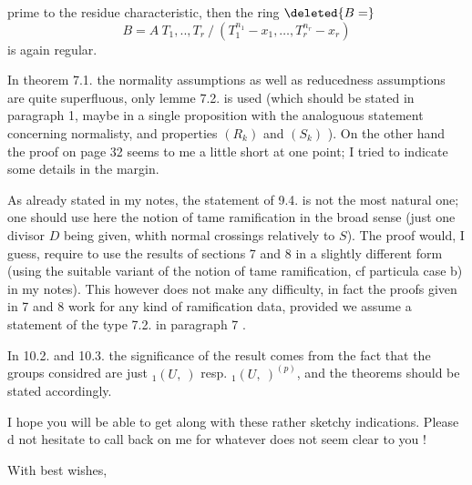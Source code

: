 prime to the residue characteristic, then the ring $\deleted{B=}$
\[
B=A\ T_1,..,T_r\ /\ (T_1^{n_1}-x_1,\ldots,T_r^{n_r}-x_r)
\]
is again regular.

In theorem 7.1. the normality assumptions as well as reducedness assumptions are quite superfluous, only lemme 7.2. is used (which should be stated in paragraph 1, maybe in a single proposition with the analoguous statement concerning normalisty, and properties $(R_k)$ and $(S_k)$ ). On the other hand the proof on page 32 seems to me  a little short at one point; I tried to indicate some details in the margin.

As already stated in my notes, the statement of 9.4. is not the most natural one; one should use here the notion of tame ramification in the broad sense (just one divisor $D$ being given, whith normal crossings relatively to $S$).  The proof would, I guess, require to use the results of sections 7 and 8 in a slightly different form (using the suitable variant of the notion of tame ramification, cf  particula
case b) in my notes). This however does not make any difficulty, in fact the proofs given in 7 and 8 work for any kind of ramification data, provided we assume a statement of the type 7.2. in paragraph 7 .

In 10.2. and 10.3. the significance of the result comes from the fact that the groups considred are just ${}_1(U,\ )$ resp. ${}_1(U,\ )^{(p)}$, and the theorems should be stated accordingly.

I hope you will be able to get along with these rather sketchy indications. Please d not hesitate to call back on me for whatever does not seem clear to you !

With best wishes,\\
